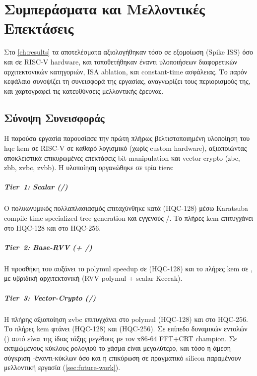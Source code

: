 \chapter{Συμπεράσματα και Μελλοντικές Επεκτάσεις}
\label{ch:conclusions}

Στο \cref{ch:results} τα αποτελέσματα αξιολογήθηκαν τόσο σε εξομοίωση (Spike ISS)
όσο και σε RISC-V hardware, και τοποθετήθηκαν έναντι υλοποιήσεων
διαφορετικών αρχιτεκτονικών κατηγοριών\ifTODO, ISA ablation, και constant-time
ασφάλειας\fi. Το παρόν κεφάλαιο
συνοψίζει τη συνεισφορά της εργασίας, αναγνωρίζει τους περιορισμούς της, και
χαρτογραφεί τις κατευθύνσεις μελλοντικής έρευνας.

\section{Σύνοψη Συνεισφοράς}
\label{sec:summary}

Η παρούσα εργασία παρουσίασε την πρώτη πλήρως βελτιστοποιημένη υλοποίηση του \gls{hqc} \gls{kem}
σε RISC-V σε καθαρό λογισμικό (χωρίς custom hardware), αξιοποιώντας αποκλειστικά επικυρωμένες επεκτάσεις bit-manipulation και vector-crypto (\gls{zbc},
\gls{zbb}, \gls{zvbc}, \gls{zvbb}). Η υλοποίηση οργανώθηκε σε τρία tiers:

\paragraph{Tier~1: Scalar (\Zbc/\Zbb)}
Ο πολυωνυμικός πολλαπλασιασμός επιταχύνθηκε κατά  (HQC-128) μέσω
Karatsuba compile-time specialized tree generation και εγγενούς \clmul/\clmulh. Το πλήρες
\gls{kem} επιτυγχάνει  στο HQC-128 και
 στο HQC-256.

\paragraph{Tier~2: Base-RVV (\RVV + \Zbc/\Zbb)}
Η προσθήκη του  αυξάνει το polymul
speedup σε  (HQC-128) και το πλήρες \gls{kem} σε ,
με υβριδική αρχιτεκτονική (RVV polymul + scalar Keccak).

\paragraph{Tier~3: Vector-Crypto (\Zvbc/\Zvbb)}
Η πλήρης αξιοποίηση \gls{zvbc}  επιτυγχάνει  στο
polymul (HQC-128) και  στο HQC-256. Το πλήρες \gls{kem} φτάνει
 (HQC-128) και  (HQC-256). Σε επίπεδο δυναμικών
εντολών (\instret) αυτό είναι
της ίδιας τάξης μεγέθους με τον x86-64 FFT+CRT champion. Σε εκτιμώμενους κύκλους
ρολογιού το χάσμα είναι μεγαλύτερο, και
τόσο η άμεση σύγκριση \instret-έναντι-κύκλων όσο και η επικύρωση σε πραγματικό
silicon παραμένουν μελλοντική εργασία (\cref{sec:future-work}).

